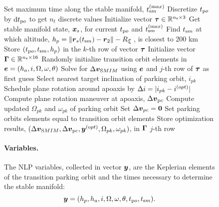 \begin{figure*}[b!]
\begin{algorithm}[!b]
\begin{algorithmic}[]
		\State Set maximum time along the stable manifold, $t^{(\textrm max)}_{\textrm sm}$
		\State Discretize $t_{\textrm po}$ by $\textrm{d}t_{\textrm po}$ to get $n_t$ discrete values
		\State Initialize vector $\boldsymbol{\tau}\in\mathbb{R}^{n_t\times3}$
		\State Get stable manifold state, $\boldsymbol{x}_s$, for current $t_{\textrm po}$ and $t^{(\textrm max)}_{\textrm sm}$ 
		\State Find $t_{\textrm sm}$ at which altitude, $h_p = \|\vect{r}_s(t_{\textrm sm})-\vect{r}_2\|-R_{\leftmoon}$, is closest to $200$ km
		\State Store $(t_{\textrm po},t_{\textrm sm},h_p)$ in the $k$-th row of vector $\boldsymbol{\tau}$
		\EndFor
		\EndProcedure
		\State Initialize vector $\boldsymbol{\Gamma}\in\mathbb{R}^{n_t\times16}$
		\Repeat
		\State Randomly initialize transition orbit elements in $\boldsymbol{e} = (h_a,i,\Omega,\omega,\theta)$
		\State Solve for $\Delta\boldsymbol{v}_{\textrm SMIM}$ using $\boldsymbol{e}$ and $j$-th row of $\boldsymbol{\tau}$ as first guess 
		\State Select nearest target inclination of parking orbit, $i_{pk}$ 
		\State Schedule plane rotation around apoaxis by $\Delta i = |i_{pk}-i^{\textrm (opt)}|$
		\State Compute plane rotation maneuver at apoaxis, $\Delta\boldsymbol{v}_{\textrm pc}$
		\State Compute updated $\Omega_{pk}$ and $\omega_{pk}$ of parking orbit
		\Else
		\State Set $\Delta\boldsymbol{v}_{pc} = \boldsymbol{0}$
		\State Set parking orbits elements equal to transition orbit elements
		\EndIf
		\State Store optimization results, $(\Delta\boldsymbol{v}_{\textrm SMIM},\Delta\boldsymbol{v}_{\textrm pc},\boldsymbol{y}^{(\textrm opt)},\Omega_{pk},\omega_{pk})$, in $\boldsymbol{\Gamma}$ $j$-th row
		\EndLoop
		\EndProcedure
	\end{algorithmic}
\end{algorithm}
% 

\paragraph{Variables.}The {NLP} variables, collected in vector $\boldsymbol{y}$, are the Keplerian elements of the transition parking orbit and the times necessary to determine the stable manifold:
%
\begin{equation}
\boldsymbol{y} = (h_p,h_a,i,\Omega,\omega,\theta,t_{\textrm po},t_{\textrm sm}).
\end{equation}
%


\end{figure*}
